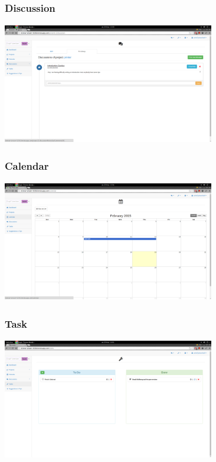 \subsubsection{Discussion}

\begin{center}
\includegraphics[height=200px, width=350px]{./img/dsgn_img/discussion.png}
	
\end{center}

\subsubsection{Calendar}

\begin{center}
\includegraphics[height=200px, width=350px]{./img/dsgn_img/calendar.png}
	
\end{center}

\subsubsection{Task}

\begin{center}
\includegraphics[height=200px, width=350px]{./img/dsgn_img/task.png}
	
\end{center}

